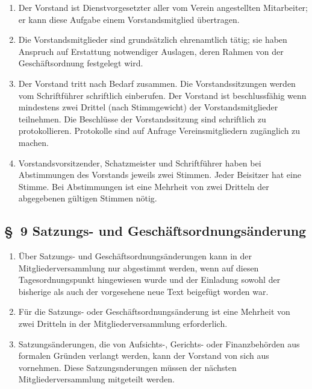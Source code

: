 \documentclass[10pt,a4paper]{scrartcl}
\begin{document}
\begin{enumerate}
	\item Der Vorstand ist Dienstvorgesetzter aller vom Verein angestellten Mitarbeiter;
		er kann diese Aufgabe einem Vorstandsmitglied {\"u}bertragen.
	\item Die Vorstandsmitglieder sind grunds{\"a}tzlich ehrenamtlich t{\"a}tig; sie haben Anspruch
		auf Erstattung notwendiger Auslagen, deren Rahmen von der Gesch{\"a}ftsordnung
		festgelegt wird.
    \item Der Vorstand tritt nach Bedarf zusammen. Die Vorstandssitzungen
    werden vom Schriftf{\"u}hrer schriftlich einberufen. Der Vorstand ist
    beschlussf{\"a}hig wenn mindestens zwei Drittel (nach Stimmgewicht) der Vorstandsmitglieder
    teilnehmen. Die Beschl{\"u}sse der Vorstandssitzung sind schriftlich zu
    protokollieren. Protokolle sind auf Anfrage Vereinsmitgliedern zug{\"a}nglich zu machen.
    \item Vorstandsvorsitzender, Schatzmeister und Schriftf{\"u}hrer haben bei
    Abstimmungen des Vorstands jeweils zwei Stimmen. Jeder Beisitzer hat eine
    Stimme. Bei Abstimmungen ist eine Mehrheit von zwei Dritteln der
    abgegebenen g{\"u}ltigen Stimmen n{\"o}tig.
\end{enumerate}
%
%
\subsection*{\S \ 9 Satzungs- und Gesch{\"a}ftsordnungs{\"a}nderung}
\begin{enumerate}
	\item {\"U}ber Satzungs- und Gesch{\"a}ftsordnungs{\"a}nderungen kann in der Mitgliederversammlung
		nur abgestimmt werden, wenn auf diesen Tagesordnungspunkt hingewiesen wurde und der
		Einladung sowohl der bisherige als auch der vorgesehene neue Text beigef{\"u}gt
		worden war.
	\item F{\"u}r die Satzungs- oder Gesch{\"a}ftsordnungs{\"a}nderung ist eine Mehrheit von zwei
		Dritteln in der Mitgliederversammlung erforderlich.
	\item Satzungs{\"a}nderungen, die von Aufsichts-, Gerichts- oder Finanz\-be\-h{\"o}r\-den aus formalen
		Gr{\"u}n\-den verlangt werden, kann der Vorstand von sich aus vornehmen. Diese
		Sat\-zungsn\-der\-ung\-en m{\"u}s\-sen der n{\"a}chs\-ten Mitgliederversammlung mitgeteilt
		werden.
\end{enumerate}
%
%
\end{document}
